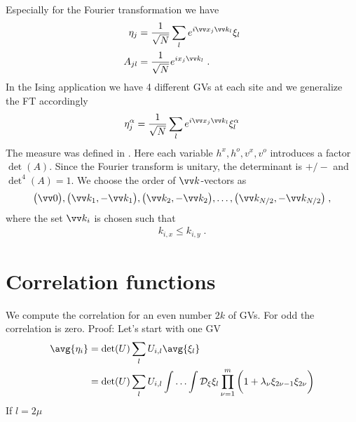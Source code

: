 Especially for the Fourier transformation we have
%
\begin{align*}
\eta_{j} &= \frac{1}{\sqrt{N}}\sum_{l} e^{i  \vv x_{j}\vv k_{l} } \xi_{l}\\
A_{j l} &= \frac{1}{\sqrt{N}} e^{i  x_{j}\vv k_{l}}\;.
\end{align*}
%
%
In the Ising application we have 4 different GVs at each site and we generalize the FT
accordingly
%
\begin{align}\label{eq:}
\eta^{\alpha}_{j} &= \frac{1}{\sqrt{N}}\sum_{l} e^{i  \vv x_{j}\vv k_{l} } \xi^{\alpha}_{l}\\
\end{align}
%
The measure was defined in . Here each variable $h^{x},h^{o},v^{x},v^{o}$ introduces a factor $\det(A)$. Since 
the Fourier transform is unitary, the determinant is $+/-$ and $\det^{4}(A) = 1$. We choose the order of $\vv k$-vectors as
%
\begin{align*}
\big(\vv 0\big),\big(\vv k_{1},-\vv k_{1}\big),\big(\vv k_{2},-\vv k_{2}\big),\ldots, \big(\vv k_{N/2},-\vv k_{N/2}\big)\;,
\end{align*}
% 
where the set $\vv k_{i}$ is chosen such that
%
\begin{align*}
k_{i,x} \le k_{i,y}\;.
\end{align*}
%

\section{Correlation functions}


We compute the correlation for an even number $2k$ of GVs. For odd the correlation is zero.
Proof: Let's start with one GV
%
\begin{align*}
\avg{\eta_{i}} &= \det(U) \sum_{l} U_{i,l}  \avg{\xi_{l}}\\
&=\det(U) \sum_{l} U_{i,l}  \Int \Dxi \xi_{l} \prod_{\nu=1}^{m} \bigg( 1 + \lambda_{\nu} 
\xi_{2\nu-1}\xi_{2\nu}\bigg)
\end{align*}
%
If $l=2\mu$

